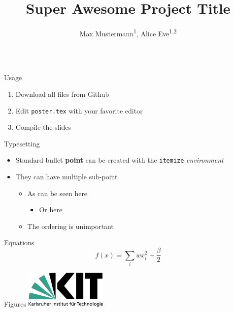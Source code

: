 \documentclass[t,aspectratio=1610]{beamer}
\title{Super Awesome Project Title}
\author{Max Mustermann\textsuperscript{1}, Alice Eve\textsuperscript{1,2}}
\institute{
    \textsuperscript{1} Helmholtz Center ABC\linebreak
    \textsuperscript{1,2} Helmholtz Center XYZ
}
\begin{document}
\begin{frame}[fragile]
    \begin{columns}[t]
        \begin{column}{.5\linewidth}
            \begin{pblock}{Usage}
                \begin{enumerate}
                    \item Download all files from Github
                    \item Edit \texttt{poster.tex} with your favorite editor
                    \item Compile the slides
                \end{enumerate}
            \end{pblock}

            \begin{pblock}{Typesetting}
                \begin{itemize}
                    \item Standard bullet \textbf{point} can be created with the \texttt{itemize} \textit{environment}
                    \item They can have multiple sub-point
                    \begin{itemize}
                        \item As can be seen here
                        \begin{itemize}
                            \item Or here
                        \end{itemize}
                        \item The ordering is unimportant
                    \end{itemize}
                \end{itemize}
            \end{pblock}

            \begin{pblock}{Equations}
                \begin{equation*}
                    f(x) = \sum_i wx_i^2 + \frac{\beta}{2}
                \end{equation*}
            \end{pblock}

            \begin{pblock}{Figures}
                \centering
                \includegraphics[width=0.3\textwidth]{logos/kit.pdf}
            \end{pblock}
            

\end{column}
\end{columns}
\end{frame}
\end{document}
